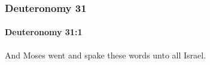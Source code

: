 	\subsubsection{Deuteronomy 31} %
		\label{DEUTERONOMY-31}

		\paragraph{Deuteronomy 31:1} %
			\label{DEUTERONOMY-31-1}

			And Moses went and spake these words unto all Israel.


